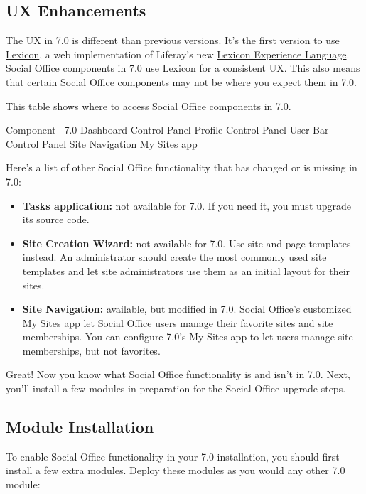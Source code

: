 \subsection{UX Enhancements}\label{ux-enhancements}

The UX in 7.0 is different than previous versions. It's the first
version to use \href{https://liferay.github.io/clay/}{Lexicon}, a web
implementation of Liferay's new \href{https://lexicondesign.io/}{Lexicon
Experience Language}. Social Office components in 7.0 use Lexicon for a
consistent UX. This also means that certain Social Office components may
not be where you expect them in 7.0.

This table shows where to access Social Office components in 7.0.

Component \textbar{} ~7.0 \textbar{} Dashboard \textbar{} Control Panel
\textbar{} Profile \textbar{} Control Panel \textbar{} User Bar
\textbar{} Control Panel \textbar{} Site Navigation \textbar{} My Sites
app \textbar{}

Here's a list of other Social Office functionality that has changed or
is missing in 7.0:

\begin{itemize}
\item
  \textbf{Tasks application:} not available for 7.0. If you need it, you
  must upgrade its source code.
\item
  \textbf{Site Creation Wizard:} not available for 7.0. Use site and
  page templates instead. An administrator should create the most
  commonly used site templates and let site administrators use them as
  an initial layout for their sites.
\item
  \textbf{Site Navigation:} available, but modified in 7.0. Social
  Office's customized My Sites app let Social Office users manage their
  favorite sites and site memberships. You can configure 7.0's My Sites
  app to let users manage site memberships, but not favorites.
\end{itemize}

Great! Now you know what Social Office functionality is and isn't in
7.0. Next, you'll install a few modules in preparation for the Social
Office upgrade steps.

\subsection{Module Installation}\label{module-installation}

To enable Social Office functionality in your 7.0 installation, you
should first install a few extra modules. Deploy these modules as you
would any other 7.0 module:

